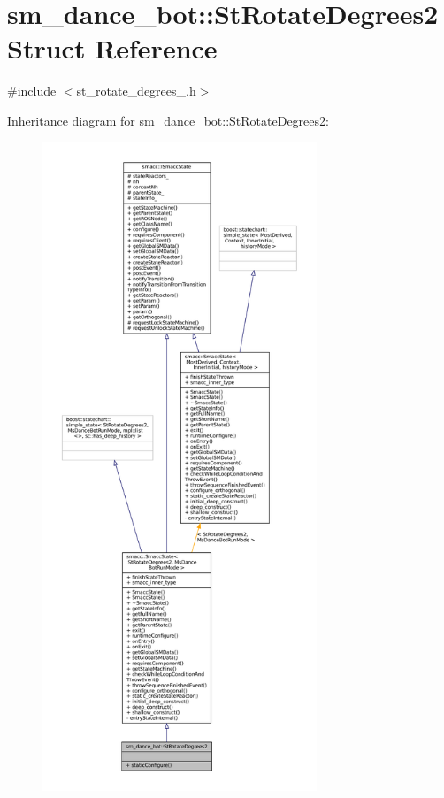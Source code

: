 \hypertarget{structsm__dance__bot_1_1StRotateDegrees2}{}\section{sm\+\_\+dance\+\_\+bot\+:\+:St\+Rotate\+Degrees2 Struct Reference}
\label{structsm__dance__bot_1_1StRotateDegrees2}


{\ttfamily \#include $<$st\+\_\+rotate\+\_\+degrees\+\_.\+h$>$}



Inheritance diagram for sm\+\_\+dance\+\_\+bot\+:\+:St\+Rotate\+Degrees2\+:
\nopagebreak
\begin{figure}[H]
\begin{center}
\leavevmode
\includegraphics[height=550pt]{structsm__dance__bot_1_1StRotateDegrees2__inherit__graph}
\end{center}
\end{figure}


